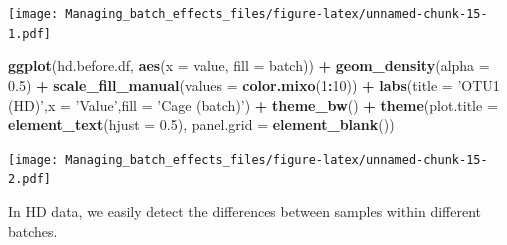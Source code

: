 \documentclass[]{book}
\newenvironment{Shaded}{\begin{snugshade}}{\end{snugshade}}
\newcommand{\KeywordTok}[1]{\textcolor[rgb]{0.13,0.29,0.53}{\textbf{#1}}}
\newcommand{\DataTypeTok}[1]{\textcolor[rgb]{0.13,0.29,0.53}{#1}}
\newcommand{\DecValTok}[1]{\textcolor[rgb]{0.00,0.00,0.81}{#1}}
\newcommand{\FloatTok}[1]{\textcolor[rgb]{0.00,0.00,0.81}{#1}}
\newcommand{\StringTok}[1]{\textcolor[rgb]{0.31,0.60,0.02}{#1}}
\newcommand{\CommentTok}[1]{\textcolor[rgb]{0.56,0.35,0.01}{\textit{#1}}}
\newcommand{\OperatorTok}[1]{\textcolor[rgb]{0.81,0.36,0.00}{\textbf{#1}}}
\newcommand{\NormalTok}[1]{#1}
\begin{document}
\begin{Shaded}
\end{Shaded}

\texttt{[image: Managing\_batch\_effects\_files/figure-latex/unnamed-chunk-15-1.pdf]}

\begin{Shaded}
\begin{Highlighting}[]
\KeywordTok{ggplot}\NormalTok{(hd.before.df, }\KeywordTok{aes}\NormalTok{(}\DataTypeTok{x =}\NormalTok{ value, }\DataTypeTok{fill =}\NormalTok{ batch)) }\OperatorTok{+}\StringTok{ }
\StringTok{  }\KeywordTok{geom_density}\NormalTok{(}\DataTypeTok{alpha =} \FloatTok{0.5}\NormalTok{) }\OperatorTok{+}\StringTok{ }\KeywordTok{scale_fill_manual}\NormalTok{(}\DataTypeTok{values =} \KeywordTok{color.mixo}\NormalTok{(}\DecValTok{1}\OperatorTok{:}\DecValTok{10}\NormalTok{)) }\OperatorTok{+}\StringTok{ }
\StringTok{  }\KeywordTok{labs}\NormalTok{(}\DataTypeTok{title =} \StringTok{'OTU1 (HD)'}\NormalTok{,}\DataTypeTok{x =} \StringTok{'Value'}\NormalTok{,}\DataTypeTok{fill =} \StringTok{'Cage (batch)'}\NormalTok{) }\OperatorTok{+}\StringTok{ }
\StringTok{  }\KeywordTok{theme_bw}\NormalTok{() }\OperatorTok{+}\StringTok{ }\KeywordTok{theme}\NormalTok{(}\DataTypeTok{plot.title =} \KeywordTok{element_text}\NormalTok{(}\DataTypeTok{hjust =} \FloatTok{0.5}\NormalTok{), }
                     \DataTypeTok{panel.grid =} \KeywordTok{element_blank}\NormalTok{())}
\end{Highlighting}
\end{Shaded}

\texttt{[image: Managing\_batch\_effects\_files/figure-latex/unnamed-chunk-15-2.pdf]}

In HD data, we easily detect the differences between samples within
different batches.
\end{document}

